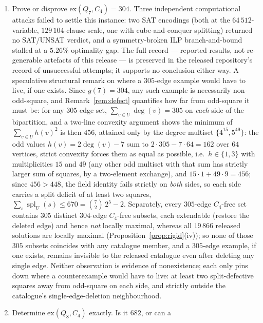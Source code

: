 \documentclass[12pt]{article}
\newcommand{\ex}{\mathrm{ex}}
\begin{document}
\begin{enumerate}
  \item\label{op:q7exact} Prove or disprove $\ex(Q_7,C_4)=304$.
    Three independent computational attacks failed to settle this
    instance: two SAT encodings (both at the $64\,512$-variable,
    $129\,104$-clause scale, one with cube-and-conquer splitting) returned
    no SAT/UNSAT verdict, and a symmetry-broken ILP branch-and-bound
    stalled at a $5.26\%$ optimality gap. The full record --- reported
    results, not re-generable artefacts of this release --- is preserved in the released repository's record of unsuccessful
    attempts; it supports no conclusion either way.
        A speculative structural remark on where a $305$-edge example would
    have to live, if one exists. Since $g(7)=304$, any such example is
    necessarily non-odd-square, and Remark~\ref{rem:defect} quantifies
    how far from odd-square it must be: for any $305$-edge set,
    $\sum_{v\in U}\deg(v)=305$ on \emph{each} side of the bipartition,
    and a two-line convexity argument shows the minimum of
    $\sum_{v\in U}h(v)^2$ is then $456$, attained only by the degree
    multiset $\{4^{15},5^{49}\}$: the odd values $h(v)=2\deg(v)-7$ sum
    to $2\cdot305-7\cdot64=162$ over $64$ vertices, strict convexity
    forces them as equal as possible, i.e.\ $h\in\{1,3\}$ with
    multiplicities $15$ and $49$ (any other odd multiset with that sum
    has strictly larger sum of squares, by a two-element exchange), and
    $15\cdot1+49\cdot9=456$; since $456>448$,
    the field identity fails strictly on \emph{both} sides, so each side
    carries a split deficit of at least two squares,
    $\sum_s\operatorname{spl}_U(s)\le670=\binom72\,2^{5}-2$.
    Separately, every $305$-edge $C_4$-free set contains $305$ distinct
    $304$-edge $C_4$-free subsets, each extendable (restore the deleted
    edge) and hence \emph{not} locally maximal, whereas all $19\,866$
    released solutions are locally maximal
    (Proposition~\ref{prop:rigid}(iv)); so none of those $305$ subsets
    coincides with any catalogue member, and a $305$-edge example, if one
    exists, remains invisible to the released catalogue even after
    deleting any single edge. Neither observation is evidence of
    nonexistence; each only pins down where a counterexample would have
    to live: at least two split-defective squares away from odd-square on
    each side, and strictly outside the catalogue's single-edge-deletion
    neighbourhood.
  \item\label{op:q8exact} Determine $\ex(Q_8,C_4)$ exactly. Is it $682$, or can a

\end{enumerate}
\end{document}
